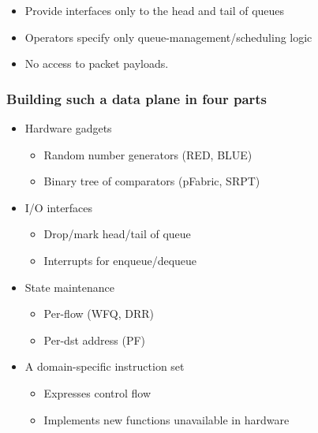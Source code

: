 \begin{Large}
\begin{frame}[plain]

\begin{itemize}
\item Provide interfaces only to the head and tail of queues
\item Operators specify only queue-management/scheduling logic
\item No access to packet payloads.
\end{itemize}
\end{frame}

\begin{frame}[plain]
\frametitle{Building such a data plane in four parts}
\begin{itemize}
\item Hardware gadgets
      \begin{itemize}
      \item Random number generators (RED, BLUE)
      \item Binary tree of comparators (pFabric, SRPT)
      \end{itemize}

\item I/O interfaces
      \begin{itemize}
      \item Drop/mark head/tail of queue
      \item Interrupts for enqueue/dequeue
      \end{itemize}

\item State maintenance
      \begin{itemize}
      \item Per-flow (WFQ, DRR)
      \item Per-dst address (PF)
      \end{itemize}

\item A domain-specific instruction set
      \begin{itemize}
      \item Expresses control flow
      \item Implements new functions unavailable in hardware
      \end{itemize}
\end{itemize}
\end{frame}


\end{Large}
